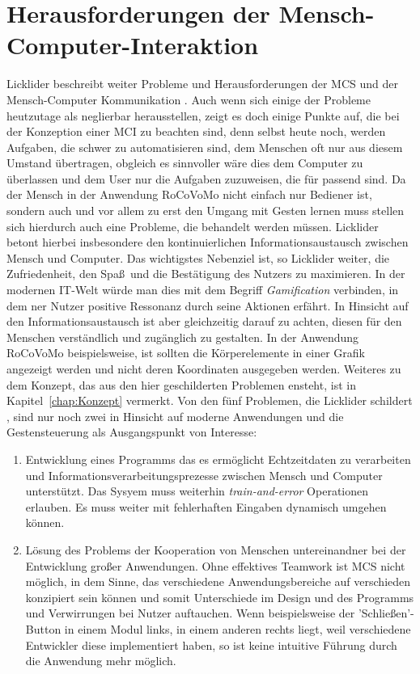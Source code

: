 \section{Herausforderungen der Mensch-Computer-Interaktion}
Licklider beschreibt weiter Probleme und Herausforderungen der \gls{MCS} und der Mensch-Computer Kommunikation \cite{bib:Lick_Online}. Auch wenn sich einige der Probleme heutzutage als neglierbar herausstellen, zeigt es doch einige Punkte auf, die bei der Konzeption einer \gls{MCI} zu beachten sind, denn selbst heute noch, werden Aufgaben, die schwer zu automatisieren sind, dem Menschen oft nur aus diesem Umstand \"ubertragen, obgleich es sinnvoller w\"are dies dem Computer zu \"uberlassen und dem User nur die Aufgaben zuzuweisen, die f\"ur passend sind.
\newline
Da der Mensch in der Anwendung RoCoVoMo nicht einfach nur Bediener ist, sondern auch und vor allem zu erst den Umgang mit Gesten lernen muss stellen sich hierdurch auch eine Probleme, die behandelt werden m\"ussen. Licklider betont hierbei insbesondere den kontinuierlichen Informationsaustausch zwischen Mensch und Computer. Das wichtigstes Nebenziel ist, so Licklider weiter, die Zufriedenheit, den Spa\ss~und die Best\"atigung des Nutzers zu maximieren. In der modernen IT-Welt w\"urde man dies mit dem Begriff \textit{\gls{Gamification}} verbinden, in dem ner Nutzer positive Ressonanz durch seine Aktionen erf\"ahrt.
\newline
In Hinsicht auf den Informationsaustausch ist aber gleichzeitig darauf zu achten, diesen f\"ur den Menschen verst\"andlich und zug\"anglich zu gestalten. In der Anwendung RoCoVoMo beispielsweise, ist sollten die K\"orperelemente in einer Grafik angezeigt werden und nicht deren Koordinaten ausgegeben werden. Weiteres zu dem Konzept, das aus den hier geschilderten Problemen ensteht, ist in Kapitel~\ref{chap:Konzept} vermerkt.
\newline
Von den f\"unf Problemen, die Licklider schildert \cite{bib:Lick_Online}, sind nur noch zwei in Hinsicht auf moderne Anwendungen und die Gestensteuerung als Ausgangspunkt von Interesse:
\begin{enumerate}
\item Entwicklung eines Programms das es erm\"oglicht Echtzeitdaten zu verarbeiten und Informationsverarbeitungsprezesse zwischen Mensch und Computer unterst\"utzt. Das Sysyem muss weiterhin \textit{train-and-error} Operationen erlauben. Es muss weiter mit fehlerhaften Eingaben dynamisch umgehen k\"onnen.
\item L\"osung des Problems der Kooperation von Menschen untereinandner bei der Entwicklung gro\ss er Anwendungen. Ohne effektives Teamwork ist \gls{MCS} nicht m\"oglich, in dem Sinne, das verschiedene Anwendungsbereiche auf verschieden konzipiert sein k\"onnen und somit Unterschiede im Design und des Programms und Verwirrungen bei Nutzer auftauchen. Wenn beispielsweise der 'Schlie\ss en'-Button in einem Modul links, in einem anderen rechts liegt, weil verschiedene Entwickler diese implementiert haben, so ist keine intuitive F\"uhrung durch die Anwendung mehr m\"oglich.
\end{enumerate}

